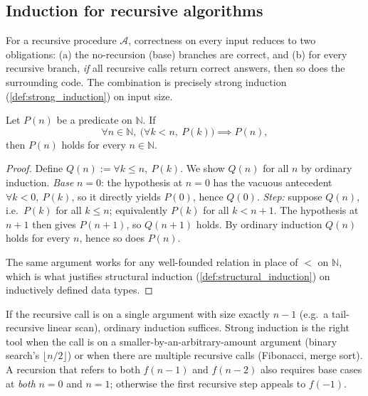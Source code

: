 \subsection{Induction for recursive algorithms}

For a recursive procedure $\mathcal{A}$, correctness on every input reduces to two obligations: (a) the no-recursion (base) branches are correct, and (b) for every recursive branch, \emph{if} all recursive calls return correct answers, then so does the surrounding code. The combination is precisely strong induction (\cref{def:strong_induction}) on input size.

\begin{theorem}
\label{thm:strong_induction}
Let $P(n)$ be a predicate on $\mathbb{N}$. If
\[
  \forall n \in \mathbb{N},\ \bigl(\forall k < n,\ P(k)\bigr) \implies P(n),
\]
then $P(n)$ holds for every $n \in \mathbb{N}$.
\end{theorem}

\begin{proof}
Define $Q(n) := \forall k \le n,\ P(k)$. We show $Q(n)$ for all $n$ by ordinary induction. \emph{Base} $n = 0$: the hypothesis at $n = 0$ has the vacuous antecedent $\forall k < 0,\ P(k)$, so it directly yields $P(0)$, hence $Q(0)$. \emph{Step:} suppose $Q(n)$, i.e.\ $P(k)$ for all $k \le n$; equivalently $P(k)$ for all $k < n+1$. The hypothesis at $n + 1$ then gives $P(n+1)$, so $Q(n+1)$ holds. By ordinary induction $Q(n)$ holds for every $n$, hence so does $P(n)$.

The same argument works for any well-founded relation in place of $<$ on $\mathbb{N}$, which is what justifies structural induction (\cref{def:structural_induction}) on inductively defined data types.
\end{proof}

\begin{remark}
If the recursive call is on a single argument with size exactly $n - 1$ (e.g.\ a tail-recursive linear scan), ordinary induction suffices. Strong induction is the right tool when the call is on a smaller-by-an-arbitrary-amount argument (binary search's $\lfloor n/2 \rfloor$) or when there are multiple recursive calls (Fibonacci, merge sort). A recursion that refers to both $f(n-1)$ and $f(n-2)$ also requires base cases at \emph{both} $n = 0$ and $n = 1$; otherwise the first recursive step appeals to $f(-1)$.
\end{remark}

